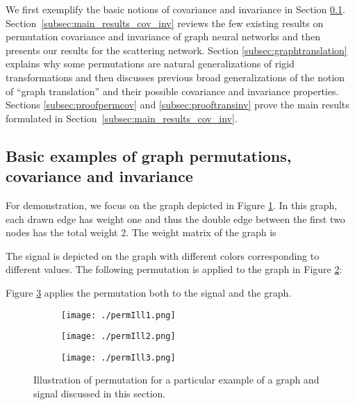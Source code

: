 \documentclass{article}
\begin{document}
We first exemplify the basic notions of covariance and invariance in Section \ref{subsec:example}. Section~\ref{subsec:main_results_cov_inv} reviews the few existing results on permutation covariance and invariance of graph neural networks and then presents our results for the scattering network.  
{Section \ref{subsec:graphtranslation} explains why some permutations are natural generalizations of rigid transformations and then discusses previous broad generalizations of the notion of ``graph translation'' and their possible covariance and invariance properties.}
Sections \ref{subsec:proofpermcov} and \ref{subsec:prooftransinv} prove the main results formulated in Section~\ref{subsec:main_results_cov_inv}.

\subsection{Basic examples of graph permutations, covariance and invariance}
\label{subsec:example}
For demonstration, we focus on the graph  depicted in Figure \ref{fig:permIll1}. In this graph, each drawn edge has weight one and thus the double edge between the first two nodes has the total weight 2. The weight matrix of the graph is 

The signal  is depicted on the graph with different colors corresponding to different values.
The following permutation is applied to the graph in Figure \ref{fig:permIll2}:

Figure \ref{fig:permIll3} applies the permutation both to the signal and the graph. 


\begin{figure}[!ht]
\centering
\begin{subfigure}{.32\textwidth}
	\centering
    \texttt{[image: ./permIll1.png]}
    \caption{}
    \label{fig:permIll1}
\end{subfigure}
\begin{subfigure}{.32\textwidth}
	\centering
    \texttt{[image: ./permIll2.png]}
    \caption{}
    \label{fig:permIll2}
\end{subfigure}
\begin{subfigure}{.32\textwidth}
	\centering
    \texttt{[image: ./permIll3.png]}
    \caption{}
    \label{fig:permIll3}
\end{subfigure}
\caption{Illustration of permutation for a particular example of a graph and signal discussed in this section.}
\label{fig:permIll}
\end{figure}
\end{document}
